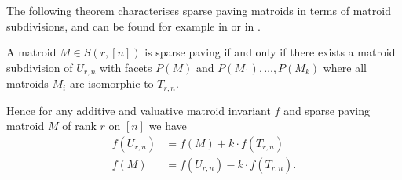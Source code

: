 The following theorem characterises sparse paving matroids in terms of matroid subdivisions, and can be found for example in \cite{FerroniMinimal} or in \cite{JoswigSchröter}.
\begin{thm}
    A matroid $M \in S(r,[n])$ is sparse paving if and only if there exists a matroid subdivision of $U_{r,n}$ with facets $P(M)$ and $P(M_1), \dots , P(M_k)$ where all matroids $M_i$ are isomorphic to $T_{r,n}$.
\end{thm}
Hence for any additive and valuative matroid invariant $f$ and sparse paving matroid $M$ of rank $r$ on $[n]$ we have
\begin{align*}
    f(U_{r,n}) &= f(M) + k\cdot f(T_{r,n})\\
    f(M) &= f(U_{r,n}) - k\cdot f(T_{r,n}).
\end{align*}

